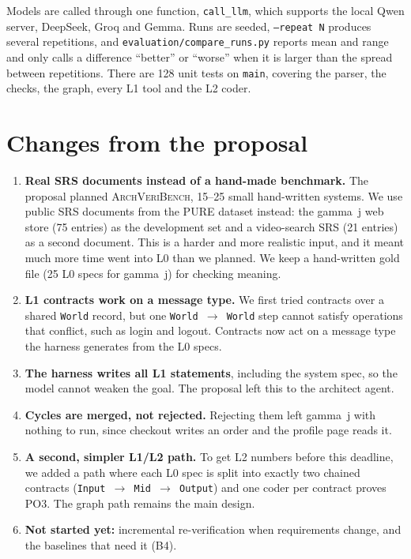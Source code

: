\documentclass[10pt,a4paper]{article}
\newcommand{\code}[1]{\texttt{\small #1}}
\begin{document}
Models are called through one function, \code{call\_llm}, which supports the local Qwen server, DeepSeek, Groq and Gemma. Runs are seeded, \code{--repeat N} produces several repetitions, and \code{evaluation/compare\_runs.py} reports mean and range and only calls a difference ``better'' or ``worse'' when it is larger than the spread between repetitions. There are 128 unit tests on \code{main}, covering the parser, the checks, the graph, every L1 tool and the L2 coder.

\section{Changes from the proposal}
\begin{enumerate}
\item \textbf{Real SRS documents instead of a hand-made benchmark.} The proposal planned \textsc{ArchVeriBench}, 15--25 small hand-written systems. We use public SRS documents from the PURE dataset instead: the gamma~j web store (75 entries) as the development set and a video-search SRS (21 entries) as a second document. This is a harder and more realistic input, and it meant much more time went into L0 than we planned. We keep a hand-written gold file (25 L0 specs for gamma~j) for checking meaning.
\item \textbf{L1 contracts work on a message type.} We first tried contracts over a shared \code{World} record, but one \code{World $\to$ World} step cannot satisfy operations that conflict, such as login and logout. Contracts now act on a message type the harness generates from the L0 specs.
\item \textbf{The harness writes all L1 statements}, including the system spec, so the model cannot weaken the goal. The proposal left this to the architect agent.
\item \textbf{Cycles are merged, not rejected.} Rejecting them left gamma~j with nothing to run, since checkout writes an order and the profile page reads it.
\item \textbf{A second, simpler L1/L2 path.} To get L2 numbers before this deadline, we added a path where each L0 spec is split into exactly two chained contracts (\code{Input $\to$ Mid $\to$ Output}) and one coder per contract proves PO3. The graph path remains the main design.
\item \textbf{Not started yet:} incremental re-verification when requirements change, and the baselines that need it (B4).
\end{enumerate}
\end{document}
